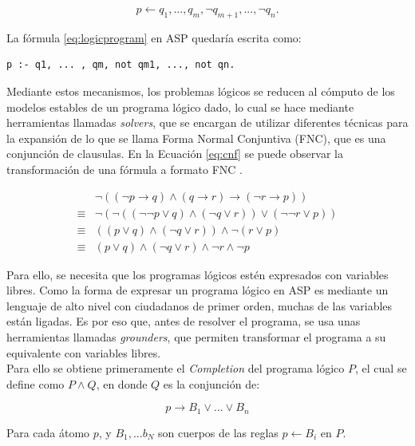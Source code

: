 \begin{equation}\label{eq:logicprogram}
	p \leftarrow q_1 , ... , q_m , \lnot q_{m+1} , ... , \lnot q_{n}.
\end{equation}

La fórmula \ref{eq:logicprogram} en ASP quedaría escrita como:

\begin{lstlisting}[label=lst:qreached]
p :- q1, ... , qm, not qm1, ..., not qn.
\end{lstlisting}

Mediante estos mecanismos, los problemas lógicos se reducen al cómputo de los modelos estables de un programa lógico dado, lo cual se hace mediante herramientas llamadas \textit{solvers}, que se encargan de utilizar diferentes técnicas para la expansión de lo que se llama Forma Normal Conjuntiva (FNC), que es una conjunción de clausulas. En la Ecuación \ref{eq:cnf} se puede observar la transformación de una fórmula a formato FNC \cite{Robinson65}.

\begin{align}\label{eq:cnf}
	& \lnot((\lnot p \rightarrow q) \land (q \rightarrow r) \rightarrow (\lnot r \rightarrow p))\\
	\equiv & \lnot(\lnot((\lnot \lnot p \lor q) \land (\lnot q \lor r)) \lor (\lnot \lnot r \lor p)) \\
	\equiv & ((p \lor q) \land (\lnot q \lor r)) \land \lnot (r \lor p) \\
	\equiv & (p \lor q) \land (\lnot q \lor r) \land \lnot r \land \lnot p
\end{align}

Para ello, se necesita que los programas lógicos estén expresados con variables libres. Como la forma de expresar un programa lógico en ASP es mediante un lenguaje de alto nivel con ciudadanos de primer orden, muchas de las variables están ligadas. Es por eso que, antes de resolver el programa, se usa unas herramientas llamadas \textit{grounders}, que permiten transformar el programa a su equivalente con variables libres. \\

Para ello se obtiene primeramente el \textit{Completion} \cite{negation} del programa lógico $P$, el cual se define como $P \land Q$, en donde $Q$ es la conjunción de:

\begin{equation*}
	p \rightarrow B_1 \lor ... \lor B_n
\end{equation*}

Para cada átomo $p$, y $B_1, ... b_N$ son cuerpos de las reglas $p \leftarrow B_i$ en $P$. \\

